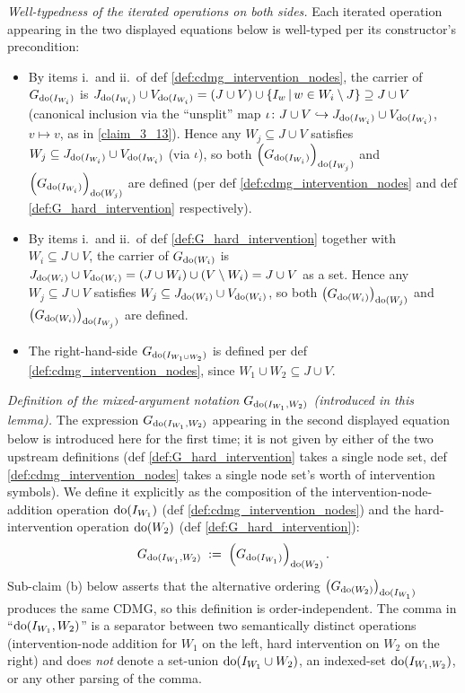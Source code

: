 \documentclass[main]{subfiles}
\begin{document}
\begin{Lem}
    \emph{Well-typedness of the iterated operations on both sides.}
    Each iterated operation appearing in the two displayed equations below is well-typed per its constructor's precondition:
    \begin{itemize}
        \item By items i.\ and ii.\ of def \ref{def:cdmg_intervention_nodes}, the carrier of $G_{\operatorname{do}(I_{W_i})}$ is $J_{\operatorname{do}(I_{W_i})} \cup V_{\operatorname{do}(I_{W_i})} = (J \cup V) \cup \left \{ I_w \,\middle|\, w \in W_i \setminus J \right \} \supseteq J \cup V$ (canonical inclusion via the ``unsplit'' map $\iota \colon J \cup V \hookrightarrow J_{\operatorname{do}(I_{W_i})} \cup V_{\operatorname{do}(I_{W_i})}$, $v \mapsto v$, as in \ref{claim_3_13}). Hence any $W_j \subseteq J \cup V$ satisfies $W_j \subseteq J_{\operatorname{do}(I_{W_i})} \cup V_{\operatorname{do}(I_{W_i})}$ (via $\iota$), so both $\left ( G_{\operatorname{do}(I_{W_i})} \right )_{\operatorname{do}(I_{W_j})}$ and $\left ( G_{\operatorname{do}(I_{W_i})} \right )_{\operatorname{do}(W_j)}$ are defined (per def \ref{def:cdmg_intervention_nodes} and def \ref{def:G_hard_intervention} respectively).
        \item By items i.\ and ii.\ of def \ref{def:G_hard_intervention} together with $W_i \subseteq J \cup V$, the carrier of $G_{\operatorname{do}(W_i)}$ is $J_{\operatorname{do}(W_i)} \cup V_{\operatorname{do}(W_i)} = (J \cup W_i) \cup (V \setminus W_i) = J \cup V$ as a set. Hence any $W_j \subseteq J \cup V$ satisfies $W_j \subseteq J_{\operatorname{do}(W_i)} \cup V_{\operatorname{do}(W_i)}$, so both $\left ( G_{\operatorname{do}(W_i)} \right )_{\operatorname{do}(W_j)}$ and $\left ( G_{\operatorname{do}(W_i)} \right )_{\operatorname{do}(I_{W_j})}$ are defined.
        \item The right-hand-side $G_{\operatorname{do}(I_{W_1 \cup W_2})}$ is defined per def \ref{def:cdmg_intervention_nodes}, since $W_1 \cup W_2 \subseteq J \cup V$.
    \end{itemize}

    \emph{Definition of the mixed-argument notation $G_{\operatorname{do}(I_{W_1}, W_2)}$ (introduced in this lemma).}
    The expression $G_{\operatorname{do}(I_{W_1}, W_2)}$ appearing in the second displayed equation below is introduced here for the first time; it is not given by either of the two upstream definitions (def \ref{def:G_hard_intervention} takes a single node set, def \ref{def:cdmg_intervention_nodes} takes a single node set's worth of intervention symbols). We define it explicitly as the composition of the intervention-node-addition operation $\operatorname{do}(I_{W_1})$ (def \ref{def:cdmg_intervention_nodes}) and the hard-intervention operation $\operatorname{do}(W_2)$ (def \ref{def:G_hard_intervention}):
    \[ G_{\operatorname{do}(I_{W_1}, W_2)} \;:=\; \left ( G_{\operatorname{do}(I_{W_1})} \right )_{\operatorname{do}(W_2)}. \]
    Sub-claim (b) below asserts that the alternative ordering $\left ( G_{\operatorname{do}(W_2)} \right )_{\operatorname{do}(I_{W_1})}$ produces the same CDMG, so this definition is order-independent. The comma in ``$\operatorname{do}(I_{W_1}, W_2)$'' is a separator between two semantically distinct operations (intervention-node addition for $W_1$ on the left, hard intervention on $W_2$ on the right) and does \emph{not} denote a set-union $\operatorname{do}(I_{W_1} \cup W_2)$, an indexed-set $\operatorname{do}(I_{W_1, W_2})$, or any other parsing of the comma.


\end{Lem}
\end{document}
